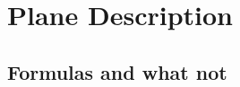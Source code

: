 \documentclass[main.tex]{subfiles}
\begin{document}
\section{Plane Description}
\subsection{Formulas and what not}
\end{document}
